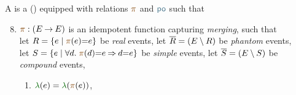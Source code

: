 \begin{definition}
  \label{def:po}
  A \PwTpo{} is a \PwT{} () equipped
  with relations $\rmrg$ and
  $\rpox$ such that 
  \begin{enumerate}[,label=(\textsc{m}\arabic*),ref=\textsc{m}\arabic*]
    \setcounter{enumi}{7}
  \item \label{pom-m} 
    $\fmrg{} : (\aEvs\fun\aEvs)$
    is an idempotent function capturing \emph{merging}, such that 
    \\
    let $\reEvs=\{\aEv\mid\fmrg{\aEv}{=}\aEv\}$ be \emph{real} events,
    let $\overline{R}=(E\setminus R)$ be \emph{phantom} events,\\
    let $\umEvs=\{\aEv\mid\forall\bEv.\;\fmrg{\bEv}{=}\aEv \limplies \bEv{=}\aEv\}$ be \emph{simple} events,
    let $\overline{S}=(E\setminus S)$ be \emph{compound} events,
    \begin{multicols}{2}
    \begin{enumerate}%
    \item \label{pom-m-lambda} 
      $\labeling(\aEv)=\labeling(\fmrg{\aEv})$,

\end{enumerate}
\end{multicols}
\end{enumerate}
\end{definition}
